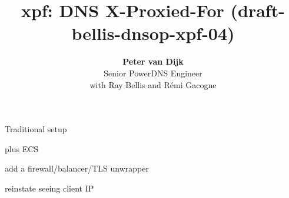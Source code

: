 \documentclass{beamer}
\title[aname]{xpf: DNS X-Proxied-For (draft-bellis-dnsop-xpf-04)}
\author{\textbf{Peter van Dijk}\\Senior PowerDNS Engineer\\with Ray Bellis and Rémi Gacogne}
\date{}
\begin{document}
\begin{frame}
  \titlepage
\end{frame}

\begin{frame}{Traditional setup}
\end{frame}

\begin{frame}{plus ECS}
\end{frame}

\begin{frame}{add a firewall/balancer/TLS unwrapper}
\end{frame}

\begin{frame}{reinstate seeing client IP}
\end{frame}
\end{document}
